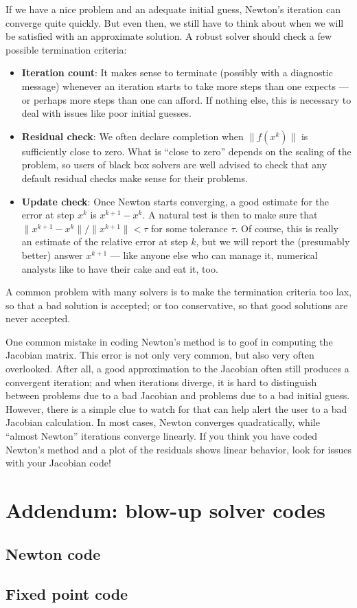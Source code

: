 \documentclass[12pt, leqno]{article} %
\begin{document}
If we have a nice problem and an adequate initial guess, Newton's
iteration can converge quite quickly.  But even then, we still have
to think about when we will be satisfied with an approximate solution.
A robust solver should check a few possible termination criteria:
\begin{itemize}
\item {\bf Iteration count}: It makes sense to terminate (possibly
  with a diagnostic message) whenever an iteration starts to take more
  steps than one expects --- or perhaps more steps than one can
  afford.  If nothing else, this is necessary to deal with issues like
  poor initial guesses.
\item {\bf Residual check}: We often declare completion when
  $\|f(x^k)\|$ is sufficiently close to zero.  What is ``close to zero''
  depends on the scaling of the problem, so users of black box solvers
  are well advised to check that any default residual checks make
  sense for their problems.
\item {\bf Update check}: Once Newton starts converging, a good
  estimate for the error at step $x^k$ is $x^{k+1}-x^k$.  A natural
  test is then to make sure that $\|x^{k+1}-x^k\|/\|x^{k+1}\| < \tau$
  for some tolerance $\tau$.  Of course, this is really an estimate
  of the relative error at step $k$, but we will report the (presumably
  better) answer $x^{k+1}$ --- like anyone else who can manage it,
  numerical analysts like to have their cake and eat it, too.
\end{itemize}
A common problem with many solvers is to make the termination criteria
too lax, so that a bad solution is accepted; or too conservative, so
that good solutions are never accepted.

One common mistake in coding Newton's method is to goof in computing
the Jacobian matrix.  This error is not only very common, but also
very often overlooked.  After all, a good approximation to the
Jacobian often still produces a convergent iteration; and when
iterations diverge, it is hard to distinguish between problems due to
a bad Jacobian and problems due to a bad initial guess.  However,
there is a simple clue to watch for that can help alert the user
to a bad Jacobian calculation.  In most cases, Newton converges
quadratically, while ``almost Newton'' iterations converge
linearly.  If you think you have coded Newton's method and a
plot of the residuals shows linear behavior, look for issues with
your Jacobian code!

\newpage

\section*{Addendum: blow-up solver codes}

\subsection*{Newton code}


\newpage

\subsection*{Fixed point code}

\end{document}

